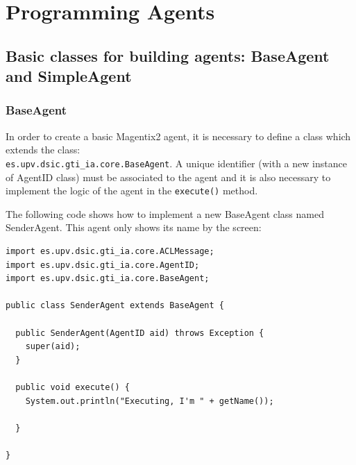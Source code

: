 \chapter{Programming Agents} \label{chap:programmingAgents}
%



\section{Basic classes for building agents: BaseAgent and SimpleAgent}

\subsection{BaseAgent}\label{sec:BaseAgent}

In order to create a basic Magentix2 agent, it is necessary to define a class which extends the class:\\ \lstinline|es.upv.dsic.gti_ia.core.BaseAgent|. A unique identifier (with a new instance of AgentID class) must be associated to the agent and it is also necessary to  implement the logic of the agent in the \lstinline|execute()| method.

The following code shows how to implement a new BaseAgent class named SenderAgent. This agent only shows its name by the screen:

\begin{lstlisting}
import es.upv.dsic.gti_ia.core.ACLMessage;
import es.upv.dsic.gti_ia.core.AgentID;
import es.upv.dsic.gti_ia.core.BaseAgent;

public class SenderAgent extends BaseAgent {

  public SenderAgent(AgentID aid) throws Exception {
	super(aid);
  }

  public void execute() {
	System.out.println("Executing, I'm " + getName());

  }

}
\end{lstlisting}

